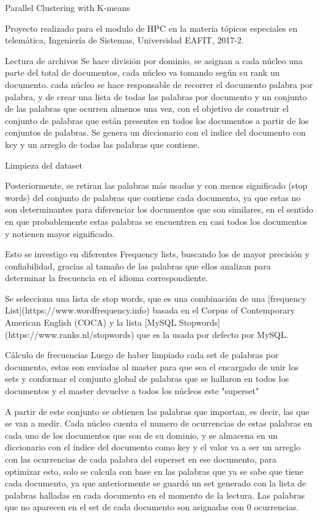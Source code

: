 \documentclass[journal]{IEEEtran}
\begin{document}
Parallel Clustering with K-means

Proyecto realizado para el modulo de HPC en la materia tópicos especiales en
telemática, Ingeniería de Sistemas, Universidad EAFIT, 2017-2.

Lectura de archivos
Se hace división por dominio, se asignan a cada núcleo una parte del total de documentos,
cada núcleo va tomando según su rank un documento.
cada núcleo se hace responsable de recorrer el documento palabra por palabra,  y de crear una
lista de todas las palabras por documento y un conjunto de las palabras que ocurren almenos una vez, con el objetivo de construir el conjunto de palabras que están presentes en todos los documentos a partir de los conjuntos de palabras. Se genera un diccionario con el indice del documento con key y un arreglo de todas las palabras que contiene.

Limpieza del dataset

Posteriormente, se retiran las palabras más usadas y con menos significado (stop words) del conjunto de palabras que contiene cada documento, ya que estas no son determinantes para diferenciar los documentos que son similares, en el sentido en que probablemente estas palabras se encuentren en casi todos los documentos y notienen mayor significado.

Esto se investigo en diferentes Frequency lists, buscando los de mayor precisión y confiabilidad, gracias al tamaño de las palabras que ellos analizan para determinar la frecuencia en el idioma correspondiente.

Se selecciona una lista de stop words, que es una combinación de una [frequency List](https://www.wordfrequency.info) basada en el Corpus of Contemporary American English (COCA) y la lista [MySQL Stopwords](https://www.ranks.nl/stopwords) que es la usada por defecto por MySQL.

Cálculo de frecuencias
Luego de haber limpiado cada set de palabras por documento, estas son enviadas al master para que sea el encargado de unir los sets y conformar el conjunto global de palabras que se hallaron en todos los documentos y el master devuelve a todos los núcleos este "superset"

A partir de este conjunto se obtienen las palabras que importan, es decir, las que se van a medir. Cada núcleo cuenta el numero de ocurrencias de estas palabras en cada uno de los
documentos que son de su dominio, y se almacena en un diccionario con el índice del documento como key y el valor va a ser un arreglo con las ocurrencias de cada palabra del superset en ese documento, para optimizar esto, solo se calcula con base en las palabras que ya se sabe que tiene cada documento, ya que anteriormente se guardó un set generado con la lista de palabras halladas en cada documento en el momento de la lectura. Las palabras que no aparecen en el set de cada documento son asignadas con 0 ocurrencias.
\end{document}
